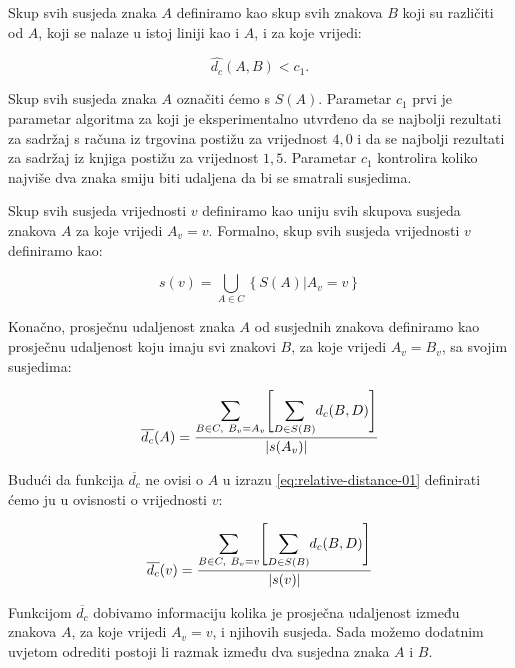 \documentclass[times, utf8, zavrsni]{fer}
\begin{document}
Skup svih susjeda znaka $A$ definiramo kao skup svih znakova $B$ koji su
različiti od $A$, koji se nalaze u istoj liniji kao i $A$, i za koje vrijedi:

\begin{equation}
\hat{d_c}(A, B) < c_1 \texttt{.}
\end{equation}

Skup svih susjeda znaka $A$ označiti ćemo s $S(A)$. Parametar $c_1$ prvi je
parametar algoritma za koji je eksperimentalno utvrđeno
da se najbolji rezultati za sadržaj s računa iz trgovina postižu za vrijednost
$4{,}0$ i da se najbolji rezultati za sadržaj iz knjiga postižu za vrijednost
$1{,}5$. Parametar $c_1$ kontrolira koliko najviše dva znaka smiju biti udaljena
da bi se smatrali susjedima.

Skup svih susjeda vrijednosti $v$ definiramo kao uniju svih skupova susjeda
znakova $A$ za koje vrijedi $A_v = v$. Formalno, skup svih susjeda vrijednosti
$v$ definiramo kao:

\begin{equation}
s(v) = \bigcup\limits_{A \in C}\left\{S(A) \vert A_v = v\right\}
\end{equation}

Konačno, prosječnu udaljenost znaka $A$ od susjednih znakova definiramo kao
prosječnu udaljenost koju imaju svi znakovi $B$, za koje vrijedi $A_v = B_v$, sa svojim susjedima:

\begin{equation}
\label{eq:relative-distance-01}
\overline{d_c}(A) =
\frac{
    \mathlarger{\sum}\limits_{B \in C,\ B_v = A_v}
    \Bigg[
    \mathlarger{\sum}\limits_{D \in S(B)} d_c(B, D)
    \Bigg]
}{|s(A_v)|}
\end{equation}

Budući da funkcija $\overline{d_c}$ ne ovisi o $A$ u izrazu \ref{eq:relative-distance-01} definirati ćemo ju u ovisnosti o vrijednosti $v$:

\begin{equation}
\label{eq:relative-distance-02}
\overline{d_c}(v) =
\frac{
    \mathlarger{\sum}\limits_{B \in C,\ B_v = v}
    \Bigg[
    \mathlarger{\sum}\limits_{D \in S(B)} d_c(B, D)
    \Bigg]
}{|s(v)|}
\end{equation}

Funkcijom $\overline{d_c}$ dobivamo informaciju kolika je prosječna udaljenost
između znakova $A$, za koje vrijedi $A_v = v$, i njihovih susjeda. Sada možemo
dodatnim uvjetom odrediti postoji li razmak između dva susjedna znaka $A$ i $B$.
\end{document}
